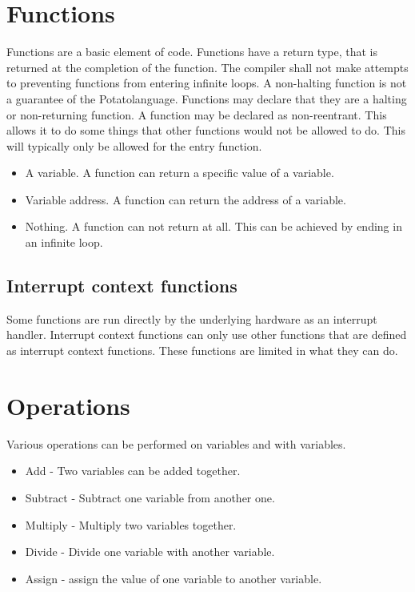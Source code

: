 \documentclass[12pt]{article}
\newcommand{\progLangNameSpace}{Potato\space }
\begin{document}
\section{ Functions}

Functions are a basic element of code. Functions have a return type, that is returned at the completion of the function. 
The compiler shall not make attempts to preventing functions from entering infinite loops. 
A non-halting function is not a guarantee of the \progLangNameSpace language. 
Functions may declare that they are a halting or non-returning function.
A function may be declared as non-reentrant. This allows it to do some things that other functions would not be allowed to do.
This will typically only be allowed for the entry function.

\begin{itemize}
\item A variable. A function can return a specific value of a variable.
\item Variable address. A function can return the address of a variable.
\item Nothing. A function can not return at all. This can be achieved by ending in an infinite loop.
\end{itemize}

\subsection {Interrupt context functions}

Some functions are run directly by the underlying hardware as an interrupt handler. Interrupt context functions can only use other functions that are defined as interrupt context functions. These functions are limited in what they can do.


\section { Operations }
Various operations can be performed on variables and with variables.
\begin{itemize}
\item Add - Two variables can be added together.
\item Subtract - Subtract one variable from another one.
\item Multiply - Multiply two variables together.
\item Divide - Divide one variable with another variable.
\item Assign - assign the value of one variable to another variable.
\end{itemize}
\end{document}
